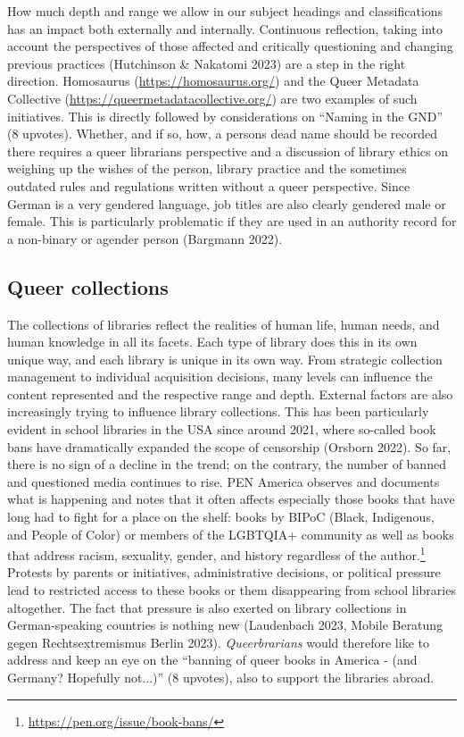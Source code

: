 \documentclass[a4paper,
fontsize=11pt,
oneside,
numbers=noperiodatend,
parskip=half-,
bibliography=totoc,
final
]{scrartcl}
\begin{document}
How much depth and range we allow in our subject headings and
classifications has an impact both externally and internally. Continuous
reflection, taking into account the perspectives of those affected and
critically questioning and changing previous practices (Hutchinson \&
Nakatomi 2023) are a step in the right direction. Homosaurus
(\url{https://homosaurus.org/}) and the Queer Metadata Collective
(\url{https://queermetadatacollective.org/}) are two examples of such
initiatives. This is directly followed by considerations on \enquote{Naming in
the GND} (8 upvotes). Whether, and if so, how, a
person\textquotesingle s dead name should be recorded there requires a
queer librarian\textquotesingle s perspective and a discussion of
library ethics on weighing up the wishes of the person, library practice
and the sometimes outdated rules and regulations written without a queer
perspective. Since German is a very gendered language, job titles are
also clearly gendered male or female. This is particularly problematic
if they are used in an authority record for a non-binary or agender
person (Bargmann 2022).

\hypertarget{queer-collections}{%
\subsection{Queer collections}\label{queer-collections}}

The collections of libraries reflect the realities of human life, human
needs, and human knowledge in all its facets. Each type of library does
this in its own unique way, and each library is unique in its own way.
From strategic collection management to individual acquisition
decisions, many levels can influence the content represented and the
respective range and depth. External factors are also increasingly
trying to influence library collections. This has been particularly
evident in school libraries in the USA since around 2021, where
so-called book bans have dramatically expanded the scope of censorship
(Orsborn 2022). So far, there is no sign of a decline in the trend; on
the contrary, the number of banned and questioned media continues to
rise. PEN America observes and documents what is happening and notes
that it often affects especially those books that have long had to fight
for a place on the shelf: books by BIPoC (Black, Indigenous, and People
of Color) or members of the LGBTQIA+ community as well as books that
address racism, sexuality, gender, and history regardless of the
author.\footnote{\url{https://pen.org/issue/book-bans/}} Protests by
parents or initiatives, administrative decisions, or political pressure
lead to restricted access to these books or them disappearing from
school libraries altogether. The fact that pressure is also exerted on
library collections in German-speaking countries is nothing new
(Laudenbach 2023, Mobile Beratung gegen Rechtsextremismus Berlin 2023).
\emph{Queerbrarians} would therefore like to address and keep an eye on
the \enquote{banning of queer books in America - (and Germany? Hopefully
not...)} (8 upvotes), also to support the libraries abroad.
\end{document}
